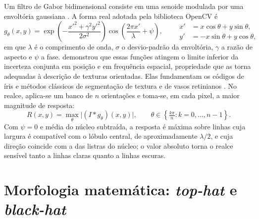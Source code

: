 \documentclass[12pt, oneside, a4paper, chapter=TITLE, section=TITLE,
               english, brazil]{abntex2}
\newcommand{\secao}[1]{\section[\texorpdfstring{\protect\MakeTextUppercase{#1}}{#1}]{#1}}
\begin{document}
Um filtro de Gabor bidimensional consiste em uma senoide modulada por uma
envoltória gaussiana \citep*{Daugman1985,Gabor1946}. A forma real adotada pela
biblioteca OpenCV \citep*{Bradski2000} é
\begin{equation}
  g_\theta(x,y) =
  \exp\!\left(-\frac{x'^2 + \gamma^2 y'^2}{2\sigma^2}\right)
  \cos\!\left(\frac{2\pi x'}{\lambda} + \psi\right),
  \qquad
  \begin{aligned}
    x' &= x\cos\theta + y\sin\theta,\\
    y' &= -x\sin\theta + y\cos\theta,
  \end{aligned}
  \label{eq:gabor}
\end{equation}
em que $\lambda$ é o comprimento de onda, $\sigma$ o desvio-padrão da
envoltória, $\gamma$ a razão de aspecto e $\psi$ a fase. \citet{Daugman1985}
demonstrou que essas funções atingem o limite inferior da incerteza conjunta
em posição e em frequência espacial, propriedade que as torna adequadas à
descrição de texturas orientadas. Elas fundamentam os códigos de íris
\citep*{Daugman1993,Daugman2004} e métodos clássicos de segmentação de textura
\citep*{Jain1991} e de vasos retinianos \citep*{Soares2006}. No realce,
aplica-se um banco de $n$ orientações e toma-se, em cada pixel, a maior
magnitude de resposta:
\begin{equation}
  R(x,y) = \max_{\theta} \bigl| (I * g_\theta)(x,y) \bigr|,
  \qquad
  \theta \in \left\{ \tfrac{k\pi}{n} : k = 0,\dots,n-1 \right\}.
  \label{eq:gabor-max}
\end{equation}
Com $\psi = 0$ e média do núcleo subtraída, a resposta é máxima sobre linhas
cuja largura é compatível com o lóbulo central, de aproximadamente
$\lambda/2$, e cuja direção coincide com a das listras do núcleo; o valor
absoluto torna o realce sensível tanto a linhas claras quanto a linhas
escuras.

\secao{Morfologia matemática: \emph{top-hat} e \emph{black-hat}}
\end{document}

